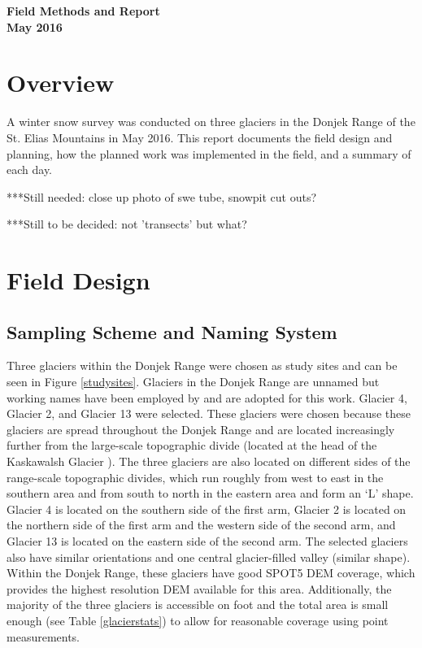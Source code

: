 \documentclass[12pt]{article}
\begin{document}

\begin{center}
\Large \textbf{Field Methods and Report \\ May 2016}
\end{center}


\section*{Overview}

A winter snow survey was conducted on three glaciers in the Donjek Range of the St. Elias Mountains in May 2016. This report documents the field design and planning, how the planned work was implemented in the field, and a summary of each day. 

***Still needed: close up photo of swe tube, snowpit cut outs?

***Still to be decided: not 'transects' but what?
\tableofcontents
\pagebreak

\section{Field Design}

\subsection{Sampling Scheme and Naming System}

Three glaciers within the Donjek Range were chosen as study sites and can be seen in Figure \ref{studysites}. Glaciers in the Donjek Range are unnamed but working names have been employed by \cite{Crompton2016} and are adopted for this work. Glacier 4, Glacier 2, and Glacier 13 were selected. These glaciers were chosen because these glaciers are spread throughout the Donjek Range and are located increasingly further from the large-scale topographic divide (located at the head of the Kaskawalsh Glacier \citep{Taylor1969}). The three glaciers are also located on different sides of the range-scale topographic divides, which run roughly from west to east in the southern area and from south to north in the eastern area and form an `L' shape. Glacier 4 is located on the southern side of the first arm, Glacier 2 is located on the northern side of the first arm and the western side of the second arm, and Glacier 13 is located on the eastern side of the second arm. The selected glaciers also have similar orientations and one central glacier-filled valley (similar shape). Within the Donjek Range, these glaciers have good SPOT5 DEM coverage, which provides the highest resolution DEM available for this area. Additionally, the majority of the three glaciers is accessible on foot and the total area is small enough (see Table \ref{glacierstats}) to allow for reasonable coverage using point measurements.
\end{document}

